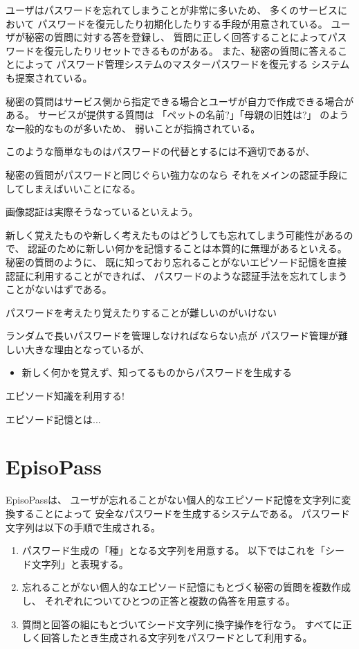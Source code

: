 \documentclass[twoside]{wiss}
\begin{document}
ユーザはパスワードを忘れてしまうことが非常に多いため、
多くのサービスにおいて
パスワードを復元したり初期化したりする手段が用意されている。
ユーザが秘密の質問に対する答を登録し、
質問に正しく回答することによってパスワードを復元したりリセットできるものがある。
また、秘密の質問に答えることによって
パスワード管理システムのマスターパスワードを復元する
システム\cite{平野亮:2011-11-07}も提案されている。

秘密の質問はサービス側から指定できる場合とユーザが自力で作成できる場合がある。
サービスが提供する質問は
「ペットの名前?」「母親の旧姓は?」
のような一般的なものが多いため、
弱いことが指摘されている。

このような簡単なものはパスワードの代替とするには不適切であるが、

秘密の質問がパスワードと同じぐらい強力なのなら
それをメインの認証手段にしてしまえばいいことになる。

画像認証\cite{小池英樹:2006-05-15}は実際そうなっているといえよう。

新しく覚えたものや新しく考えたものはどうしても忘れてしまう可能性があるので、
認証のために新しい何かを記憶することは本質的に無理があるといえる。
秘密の質問のように、
既に知っており忘れることがないエピソード記憶を直接認証に利用することができれば、
パスワードのような認証手法を忘れてしまうことがないはずである。


パスワードを考えたり覚えたりすることが難しいのがいけない

ランダムで長いパスワードを管理しなければならない点が
パスワード管理が難しい大きな理由となっているが、

\begin{itemize}
\item 新しく何かを覚えず、知ってるものからパスワードを生成する
\end{itemize}

エピソード知識を利用する!

エピソード記憶とは...

\section{EpisoPass}

EpisoPassは、
ユーザが忘れることがない個人的なエピソード記憶を文字列に変換することによって
安全なパスワードを生成するシステムである。
パスワード文字列は以下の手順で生成される。

\begin{enumerate}
\item パスワード生成の「種」となる文字列を用意する。
以下ではこれを「シード文字列」と表現する。
\item 忘れることがない個人的なエピソード記憶にもとづく秘密の質問を複数作成し、
それぞれについてひとつの正答と複数の偽答を用意する。
\item 質問と回答の組にもとづいてシード文字列に換字操作を行なう。
すべてに正しく回答したとき生成される文字列をパスワードとして利用する。
\end{enumerate}
\end{document}
